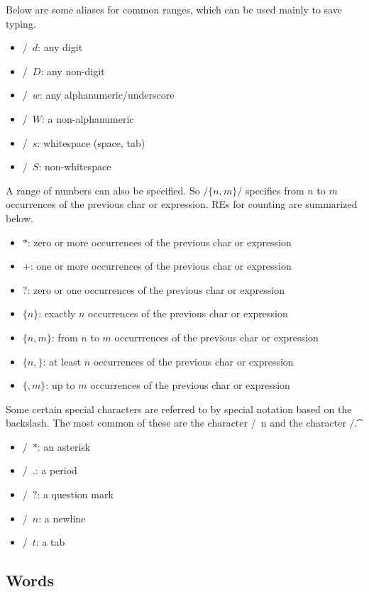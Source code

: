 \documentclass{article}
\begin{document}
Below are some aliases for common ranges, which can be used mainly to save typing. 
\begin{itemize}
  \item /\ $d$: any digit
  \item /\ $D$: any non-digit 
  \item /\ $w$: any alphanumeric/underscore 
  \item /\ $W$: a non-alphanumeric 
  \item /\ $s$: whitespace (space, tab) 
  \item /\ $S$: non-whitespace 
\end{itemize}
A range of numbers can also be specified. So $/ \{n,m\} /$ specifies from $n$ to $m$ occurrences of the previous char or expression. REs for counting are summarized below. 
\begin{itemize}
  \item $*$: zero or more occurrences of the previous char or expression 
  \item $+$: one or more occurrences of the previous char or expression 
  \item $?$: zero or one occurrences of the previous char or expression  
  \item $\{n\}$: exactly $n$ occurrences of the previous char or expression 
  \item $\{n,m\}$: from $n$ to $m$ occurrrences of the previous char or expression 
  \item $\{n,\}$: at least $n$ occurrences of the previous char or expression 
  \item $\{,m\}$: up to $m$ occurrences of the previous char or expression
\end{itemize}
Some certain special characters are referred to by special notation based on the backslash. The most common of these are the  character /\ n and the  character /\t. 
\begin{itemize}
  \item /\ $*$: an asterisk
  \item /\ $.$: a period 
  \item /\ $?$: a question mark
  \item /\ $n$: a newline 
  \item /\ $t$: a tab
\end{itemize}

\subsection{Words}
\end{document}
